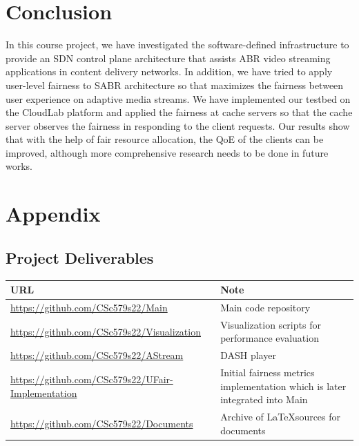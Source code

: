 \documentclass[12pt]{article}
\begin{document}
\section{Conclusion}
In this course project, we have investigated the software-defined infrastructure to provide an SDN control plane architecture that assists ABR video streaming applications in content delivery networks. In addition, we have tried to apply user-level fairness to SABR architecture so that maximizes the fairness between user experience on adaptive media streams. We have implemented our testbed on the CloudLab platform and applied the fairness at cache servers so that the cache server observes the fairness in responding to the client requests. Our results show that with the help of fair resource allocation, the QoE of the clients can be improved, although more comprehensive research needs to be done in future works.

\printbibliography[heading=bibnumbered]

\newpage

\section{Appendix}

\subsection{Project Deliverables}
\begin{center}
\begin{tabular}{ | m{20em} | m{18em} | } 
\hline
URL                                               & Note                                                                       \\ 
\hline
\url{https://github.com/CSc579s22/Main}                 & Main code repository                                                       \\ 
\hline
\url{https://github.com/CSc579s22/Visualization}        & Visualization scripts for performance evaluation                           \\ 
\hline
\url{https://github.com/CSc579s22/AStream}             & DASH player                                                                \\ 
\hline
\url{https://github.com/CSc579s22/UFair-Implementation} & Initial fairness metrics implementation which is later integrated into Main  \\ 
\hline
\url{https://github.com/CSc579s22/Documents}           & Archive of \LaTeX sources for documents                                                \\
\hline
\end{tabular}
\end{center}
\end{document}
